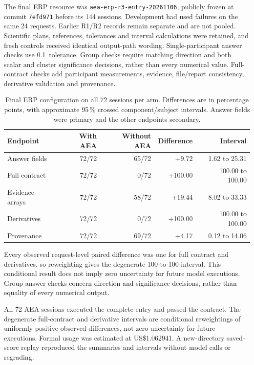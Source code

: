 The final ERP resource was \texttt{aea-erp-r3-entry-20261106}, publicly frozen at commit \texttt{7efd971} before its 144 sessions. Development had used failures on the same 24 requests. Earlier R1/R2 records remain separate and are not pooled. Scientific plans, references, tolerances and interval calculations were retained, and fresh controls received identical output-path wording. Single-participant answer checks use 0.1\,\uV{} tolerance. Group checks require matching direction and both scalar and cluster significance decisions, rather than every numerical value. Full-contract checks add participant measurements, evidence, file/report consistency, derivative validation and provenance.
\begin{table}[!htbp]
\centering\small
\caption{Final ERP configuration on all 72 sessions per arm. Differences are in percentage points, with approximate 95\,\% crossed component/subject intervals. Answer fields were primary and the other endpoints secondary.}
\label{tab:erp-paired-configurations}
\begin{tabular}{lrrrr}
\toprule
Endpoint & With AEA & Without AEA & Difference & Interval \\
\midrule
Answer fields & 72/72 & 65/72 & +9.72 & 1.62 to 25.31 \\
Full contract & 72/72 & 0/72 & +100.00 & 100.00 to 100.00 \\
Evidence arrays & 72/72 & 58/72 & +19.44 & 8.02 to 33.33 \\
Derivatives & 72/72 & 0/72 & +100.00 & 100.00 to 100.00 \\
Provenance & 72/72 & 69/72 & +4.17 & 0.12 to 14.06 \\
\bottomrule
\end{tabular}
\par\smallskip
\begin{minipage}{\linewidth}\footnotesize
Every observed request-level paired difference was one for full contract and derivatives, so reweighting gives the degenerate 100-to-100 interval. This conditional result does not imply zero uncertainty for future model executions. Group answer checks concern direction and significance decisions, rather than equality of every numerical output.
\end{minipage}
\end{table}

All 72 AEA sessions executed the complete entry and passed the contract. The degenerate full-contract and derivative intervals are conditional reweightings of uniformly positive observed differences, not zero uncertainty for future executions. Formal usage was estimated at US\$1.062941. A new-directory saved-score replay reproduced the summaries and intervals without model calls or regrading.

